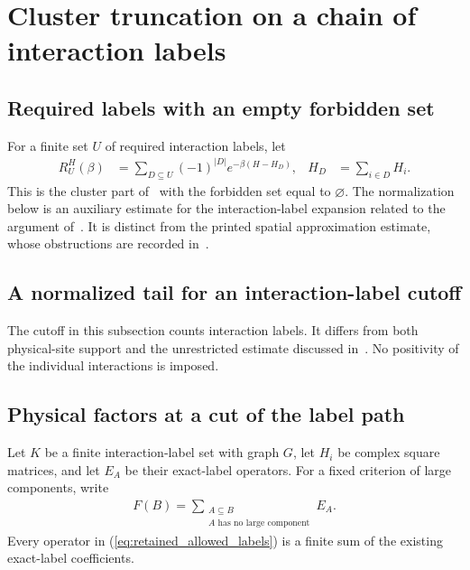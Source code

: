 \section{Cluster truncation on a chain of interaction labels}
\label{sec:interval_cluster_truncation}

\subsection{Required labels with an empty forbidden set}

For a finite set $U$ of required interaction labels, let
\begin{align}
    R_U^H(\beta)
     & =\sum_{D\subseteq U}(-1)^{|D|}
    e^{-\beta(H-H_D)},
     & H_D                            & =\sum_{i\in D}H_i.
    \label{eq:mandatory_cluster_part}
\end{align}
This is the cluster part of~\cite[``The truncated expansion as an inclusion--exclusion sum'']{QICLean2026Blueprint} with the forbidden
set equal to $\varnothing$. The normalization below is an auxiliary
estimate for the interaction-label expansion related to the argument
of~\cite[lines 1270--1291 and 1935--1968]{Arad2016RigorousRG}.
It is distinct from the printed spatial approximation estimate, whose
obstructions are recorded in~\cite{gap:alvv16_cluster_approximation}.

\subsection{A normalized tail for an interaction-label cutoff}

The cutoff in this subsection counts interaction labels. It differs from
both physical-site support and the unrestricted estimate discussed
in~\cite{gap:alvv16_cluster_approximation}. No positivity of the individual
interactions is imposed.

\subsection{Physical factors at a cut of the label path}

Let $K$ be a finite interaction-label set with graph $G$, let $H_i$ be
complex square matrices, and let $E_A$ be their exact-label operators.
For a fixed criterion of large components, write
\begin{align}
    F(B)=\sum_{\substack{A\subseteq B \\
            A\text{ has no large component}}}E_A.
    \label{eq:retained_allowed_labels}
\end{align}
Every operator in (\ref{eq:retained_allowed_labels}) is a finite sum of
the existing exact-label coefficients.


